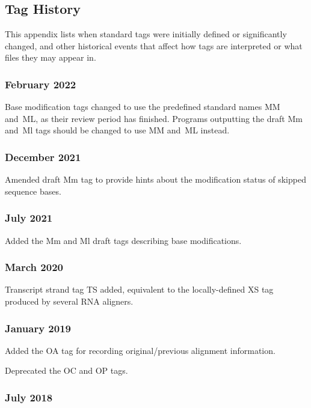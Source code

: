 \documentclass[10pt]{article}
\begin{document}
\begin{appendices}
\appendix
\section{Tag History}

This appendix lists when standard tags were initially defined or significantly changed, and other historical events that affect how tags are interpreted or what files they may appear in.

\setlength{\parindent}{0pt}
\newcommand*{\gap}{\vspace*{2ex}}

\subsubsection*{February 2022}

Base modification tags changed to use the predefined standard names MM and~ML, as their review period has finished.
Programs outputting the draft Mm and~Ml tags should be changed to use MM and~ML instead.

\subsubsection*{December 2021}

Amended draft Mm tag to provide hints about the modification status of skipped sequence bases.

\subsubsection*{July 2021}
Added the Mm and Ml draft tags describing base modifications.

\subsubsection*{March 2020}

Transcript strand tag TS added, equivalent to the locally-defined XS tag
produced by several RNA aligners.

\subsubsection*{January 2019}
Added the OA tag for recording original/previous alignment information.

Deprecated the OC and OP tags.

\subsubsection*{July 2018}


\end{appendices}
\end{document}
